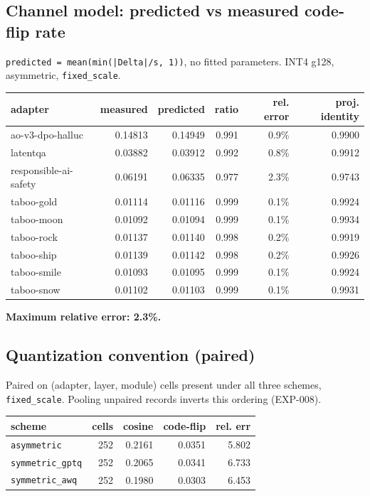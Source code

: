 \subsection{Channel model: predicted vs measured code-flip rate}

\texttt{predicted = mean(min(|Delta|/\allowbreak{}s, 1))}, no fitted parameters. INT4 g128, asymmetric, \texttt{fixed\_\allowbreak{}scale}.

\begin{table}[t]
\centering\footnotesize
\begin{tabularx}{\textwidth}{>{\hsize=1.000\hsize\raggedright\arraybackslash}Xrrrrr}
\toprule
adapter & measured & predicted & ratio & rel. error & proj. identity \\
\midrule
ao-v3-dpo-halluc & 0.14813 & 0.14949 & 0.991 & 0.9\% & 0.9900 \\
latentqa & 0.03882 & 0.03912 & 0.992 & 0.8\% & 0.9912 \\
responsible-ai-safety & 0.06191 & 0.06335 & 0.977 & 2.3\% & 0.9743 \\
taboo-gold & 0.01114 & 0.01116 & 0.999 & 0.1\% & 0.9924 \\
taboo-moon & 0.01092 & 0.01094 & 0.999 & 0.1\% & 0.9934 \\
taboo-rock & 0.01137 & 0.01140 & 0.998 & 0.2\% & 0.9919 \\
taboo-ship & 0.01139 & 0.01142 & 0.998 & 0.2\% & 0.9926 \\
taboo-smile & 0.01093 & 0.01095 & 0.999 & 0.1\% & 0.9924 \\
taboo-snow & 0.01102 & 0.01103 & 0.999 & 0.1\% & 0.9931 \\
\bottomrule
\end{tabularx}
\end{table}

\textbf{Maximum relative error: 2.3\%.}

\subsection{Quantization convention (paired)}

Paired on (adapter, layer, module) cells present under all three schemes, \texttt{fixed\_\allowbreak{}scale}. Pooling unpaired records inverts this ordering (EXP-008).

\begin{center}\footnotesize
\begin{tabular}{lrrrr}
\toprule
scheme & cells & cosine & code-flip & rel. err \\
\midrule
\texttt{asymmetric} & 252 & 0.2161 & 0.0351 & 5.802 \\
\texttt{symmetric\_\allowbreak{}gptq} & 252 & 0.2065 & 0.0341 & 6.733 \\
\texttt{symmetric\_\allowbreak{}awq} & 252 & 0.1980 & 0.0303 & 6.453 \\
\bottomrule
\end{tabular}
\end{center}

